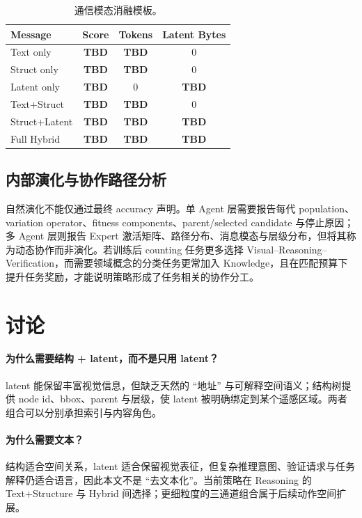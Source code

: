 \documentclass[10pt,a4paper,twocolumn]{ctexart}
\newcommand{\todo}{\textcolor{cred}{\textbf{TBD}}}
\begin{document}
\begin{table}[t]
\centering
\small
\caption{通信模态消融模板。}
\begin{tabular}{lccc}
\toprule
Message & Score & Tokens & Latent Bytes \\
\midrule
Text only & \todo & \todo & 0 \\
Struct only & \todo & \todo & 0 \\
Latent only & \todo & 0 & \todo \\
Text+Struct & \todo & \todo & 0 \\
Struct+Latent & \todo & \todo & \todo \\
Full Hybrid & \todo & \todo & \todo \\
\bottomrule
\end{tabular}
\end{table}

\subsection{内部演化与协作路径分析}
自然演化不能仅通过最终 accuracy 声明。单 Agent 层需要报告每代 population、variation operator、fitness components、parent/selected candidate 与停止原因；多 Agent 层则报告 Expert 激活矩阵、路径分布、消息模态与层级分布，但将其称为动态协作而非演化。若训练后 counting 任务更多选择 Visual--Reasoning--Verification，而需要领域概念的分类任务更常加入 Knowledge，且在匹配预算下提升任务奖励，才能说明策略形成了任务相关的协作分工。

\section{讨论}
\paragraph{为什么需要结构 + latent，而不是只用 latent？}
latent 能保留丰富视觉信息，但缺乏天然的 ``地址'' 与可解释空间语义；结构树提供 node id、bbox、parent 与层级，使 latent 被明确绑定到某个遥感区域。两者组合可以分别承担索引与内容角色。

\paragraph{为什么需要文本？}
结构适合空间关系，latent 适合保留视觉表征，但复杂推理意图、验证请求与任务解释仍适合语言，因此本文不是 ``去文本化''。当前策略在 Reasoning 的 Text+Structure 与 Hybrid 间选择；更细粒度的三通道组合属于后续动作空间扩展。
\end{document}
